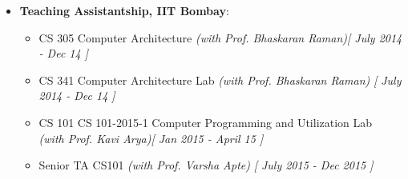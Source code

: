 \begin{itemize}
	\item \textbf{Teaching Assistantship, IIT Bombay}: \hfill \\[-0.6cm]
	\begin{itemize}
		\item CS 305 Computer Architecture  \hfill \emph{(with Prof. Bhaskaran Raman)}\hfill {\emph{[ July 2014 - Dec 14 ]}}  \\[-0.6cm]
		\item CS 341 Computer Architecture Lab \hfill \emph{(with Prof. Bhaskaran Raman)} \hfill {\emph{[ July 2014 - Dec 14 ]}} \\[-0.6cm]
		\item CS 101 CS 101-2015-1 Computer Programming and Utilization Lab \\
		\hfill \emph{(with Prof. Kavi Arya)}\hfill {\emph{[ Jan 2015 - April 15 ]}} \\[-0.6cm]
  \item Senior TA CS101 \hfill \emph{(with Prof.  Varsha Apte)} \hfill {\emph{[ July 2015 - Dec 2015 ]}} 
	\end{itemize}
\end{itemize}
